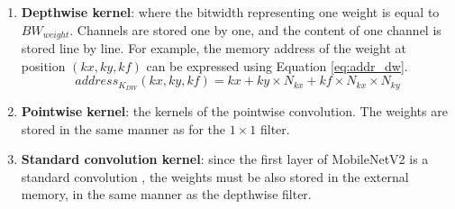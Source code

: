 \begin{enumerate}
    \item \textbf{Depthwise kernel}: where the bitwidth representing one weight is equal to $BW_{weight}$. Channels are stored one by one, and the content of one channel is stored line by line. For example, the memory address of the weight at position $\left(kx, ky, kf\right)$ can be expressed using Equation \eqref{eq:addr_dw}.
    \begin{equation}
        address_{K_{DW}}(kx, ky, kf) = kx + ky \times N_{kx} + kf \times N_{kx} \times N_{ky}
        \label{eq:addr_dw}
    \end{equation}
    \item \textbf{Pointwise kernel}: the kernels of the pointwise convolution. The weights are stored in the same manner as for the $1 \times 1$ filter.
    \item \textbf{Standard convolution kernel}: since the first layer of MobileNetV2 is a standard convolution \cite{sandler_mobilenetv2_2018}, the weights must be also stored in the external memory, in the same manner as the depthwise filter.
\end{enumerate}

